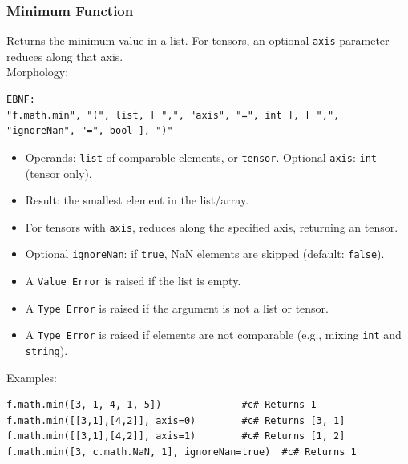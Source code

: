\subsubsection{Minimum Function}
Returns the minimum value in a list. For tensors, an optional \texttt{axis} parameter reduces along that axis. \\
Morphology:
\begin{verbatim}
EBNF:
"f.math.min", "(", list, [ ",", "axis", "=", int ], [ ",", "ignoreNan", "=", bool ], ")"
\end{verbatim}
\begin{itemize}
\item Operands: \texttt{list} of comparable elements, or \texttt{tensor}. Optional \texttt{axis}: \texttt{int} (tensor only).
\item Result: the smallest element in the list/array.
\item For tensors with \texttt{axis}, reduces along the specified axis, returning an tensor.
\item Optional \texttt{ignoreNan}: if \texttt{true}, NaN elements are skipped (default: \texttt{false}).
\item A \texttt{Value Error} is raised if the list is empty.
\item A \texttt{Type Error} is raised if the argument is not a list or tensor.
\item A \texttt{Type Error} is raised if elements are not comparable (e.g., mixing \texttt{int} and \texttt{string}).
\end{itemize}
Examples:
\begin{verbatim}
f.math.min([3, 1, 4, 1, 5])              #c# Returns 1
f.math.min([[3,1],[4,2]], axis=0)        #c# Returns [3, 1]
f.math.min([[3,1],[4,2]], axis=1)        #c# Returns [1, 2]
f.math.min([3, c.math.NaN, 1], ignoreNan=true)  #c# Returns 1
\end{verbatim}

